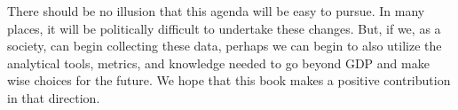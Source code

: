 There should be no illusion that this agenda will be easy to pursue.
In many places, 
it will be politically difficult to undertake these changes.
But, if we, as a society, can begin collecting these data, 
perhaps we can begin to also utilize
the analytical tools, metrics, and knowledge
needed to go beyond GDP 
and make wise choices for the future.
We hope that this book makes a positive contribution in that direction.








%
%




